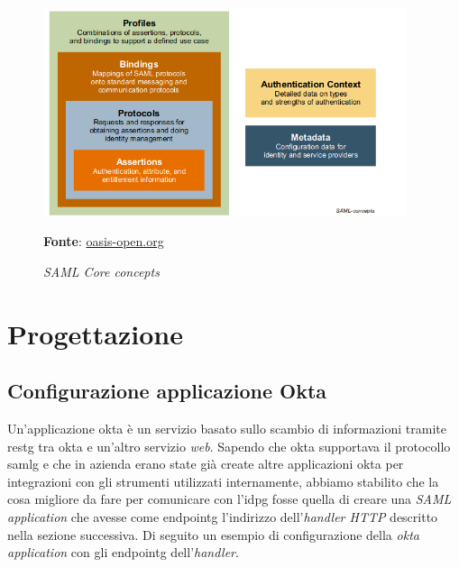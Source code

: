     \begin{figure}[h]
        \centering
        \includegraphics[width=0.95\textwidth]{immagini/SAMLCore.png}
        \caption{\textit{SAML Core concepts}}
        \textbf{Fonte}:
        \href{https://www.oasis-open.org/committees/download.php/27819/sstc-saml-tech-overview-2.0-cd-02.pdf}{oasis-open.org}
        \label{fig: SAML core}
    \end{figure}

\section{Progettazione}
\subsection{Configurazione applicazione Okta}
Un'applicazione \gls{okta} è un servizio basato sullo scambio di informazioni tramite \gls{restg} tra \gls{okta} e un'altro servizio \textit{web}. Sapendo che \gls{okta} supportava il protocollo \gls{samlg} e che in azienda erano state già create altre applicazioni \gls{okta} per integrazioni con gli strumenti utilizzati internamente, abbiamo stabilito che la cosa migliore da fare per comunicare con l'\gls{idpg} fosse quella di creare una \textit{SAML application} che avesse come \gls{endpointg} l'indirizzo dell'\textit{handler HTTP} descritto nella sezione successiva.
Di seguito un esempio di configurazione della \textit{okta application} con gli \gls{endpointg} dell'\textit{handler}.

